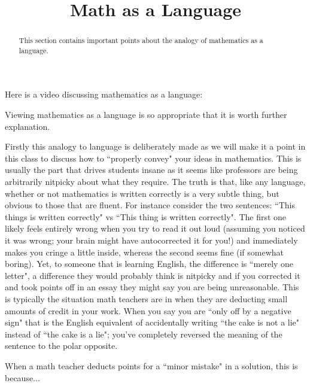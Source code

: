 \documentclass{ximera}
\title{Math as a Language}
\begin{document}
\begin{abstract}
    This section contains important points about the analogy of mathematics as a language.
\end{abstract}
\maketitle

Here is a video discussing mathematics as a language:


Viewing mathematics as a language is so appropriate that it is worth further explanation.%

Firstly this analogy to language is deliberately made as we will make it a point in this class to discuss how to ``properly convey" your ideas in mathematics. This is usually the part that drives students insane as it seems like professors are being arbitrarily nitpicky about what they require. The truth is that, like any language, whether or not mathematics is written correctly is a very subtle thing, but obvious to those that are fluent. For instance consider the two sentences: ``This things is written correctly" vs ``This thing is written correctly". The first one likely feels entirely wrong when you try to read it out loud (assuming you noticed it was wrong; your brain might have autocorrected it for you!) and immediately makes you cringe a little inside, whereas the second seems fine (if somewhat boring). Yet, to someone that is learning English, the difference is ``merely one letter", a difference they would probably think is nitpicky and if you corrected it and took points off in an essay they might say you are being unreasonable. This is typically the situation math teachers are in when they are deducting small amounts of credit in your work. When you say you are ``only off by a negative sign" that is the English equivalent of accidentally writing ``the cake is not a lie" instead of ``the cake is a lie"; you've completely reversed the meaning of the sentence to the polar opposite.

\begin{problem}
    When a math teacher deducts points for a ``minor mistake" in a solution, this is because...
    \begin{multipleChoice}
    \end{multipleChoice}
\end{problem}
\end{document}
